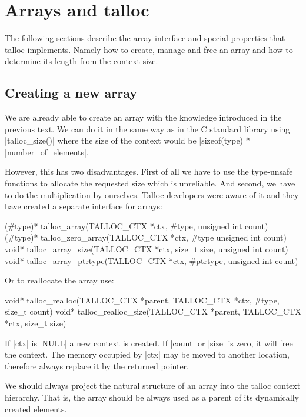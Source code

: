 \section{Arrays and talloc}
\label{talloc:sec:arrays}

The following sections describe the array interface and special properties that
talloc implements. Namely how to create, manage and free an array and how to
determine its length from the context size.

\subsection{Creating a new array}

We are already able to create an array with the knowledge introduced in the
previous text. We can do it in the same way as in the C standard library using
|talloc_size()| where the size of the context would be |sizeof(type) *|
|number_of_elements|.

However, this has two disadvantages. First of all we have to use the type-unsafe
functions to allocate the requested size which is unreliable. And second,
we have to do the multiplication by ourselves. Talloc developers were aware of
it and they have created a separate interface for arrays:

\begin{funcproto}
(#type)* talloc_array(TALLOC_CTX *ctx, #type,
                      unsigned int count)
(#type)* talloc_zero_array(TALLOC_CTX *ctx, #type
                           unsigned int count)
void* talloc_array_size(TALLOC_CTX *ctx, size_t size,
                        unsigned int count)
void* talloc_array_ptrtype(TALLOC_CTX *ctx, #ptrtype,
                           unsigned int count)
\end{funcproto}
\funclistend
Or to reallocate the array use:

\begin{funcproto}
void* talloc_realloc(TALLOC_CTX *parent,
                     TALLOC_CTX *ctx,
                     #type, size_t count)
void* talloc_realloc_size(TALLOC_CTX *parent,
                          TALLOC_CTX *ctx,
                          size_t size)
\end{funcproto}
\begin{funcdesc}
If |ctx| is |NULL| a new context is created. If |count| or |size| is zero, it
will free the context. The memory occupied by |ctx| may be moved to another
location, therefore always replace it by the returned pointer.
\end{funcdesc}
\funclistend
We should always project the natural structure of an array into the talloc
context hierarchy. That is, the array should be always used as a parent of
its dynamically created elements.

